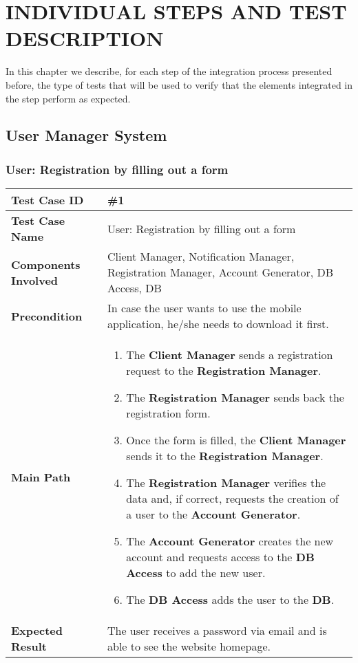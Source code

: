 \section{INDIVIDUAL STEPS AND TEST \\DESCRIPTION}
In this chapter we describe, for each step of the integration process presented before, the type of tests that will be used to verify that the elements integrated in the step perform as expected.  

\subsection{User Manager System}
\subsubsection{User: Registration by filling out a form}
\begin{center}
	\begin{tabular} { | m{4.5cm} | m{8.5cm} | }
		\hline
		\textbf{Test Case ID} & \#1\\
		\hline
		\textbf{Test Case Name} & User: Registration by filling out a form\\
		\hline
		\textbf{Components Involved} & Client Manager, Notification Manager, Registration Manager, Account Generator, DB Access, DB\\
		\hline
		\textbf{Precondition} & In case the user wants to use the mobile application, he/she needs to download it first.\\
		\hline
		\textbf{Main Path} & 
		\begin{enumerate}
			\item The \textbf{Client Manager} sends a registration request to the \textbf{Registration Manager}. 
			\item The \textbf{Registration Manager} sends back the registration form. 
			\item Once the form is filled, the \textbf{Client Manager} sends it to the \textbf{Registration Manager}.
			\item The \textbf{Registration Manager} verifies the data and, if correct, requests the creation of a user to the \textbf{Account Generator}.
			\item The \textbf{Account Generator} creates the new account and requests access to the \textbf{DB Access} to add the new user. 
			\item The \textbf{DB Access} adds the user to the \textbf{DB}.
		\end{enumerate}\\
		\hline
		\textbf{Expected Result} & The user receives a password via email and is able to see the website homepage.\\
		\hline
	\end{tabular}
\end{center}
\newpage
